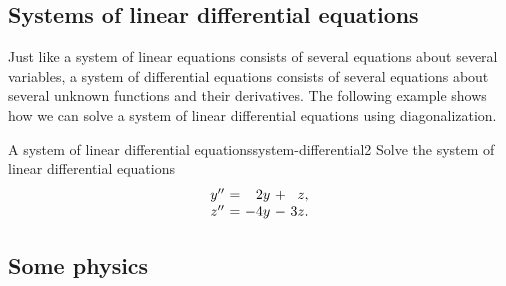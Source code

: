 \subsection{Systems of linear differential equations}

Just like a system of linear equations consists of several equations
about several variables, a system of differential equations consists
of several equations about several unknown functions and their
derivatives. The following example shows how we can solve a system of
linear differential equations using diagonalization.

\begin{example}{A system of linear differential equations}{system-differential2}
  Solve the system of linear differential equations
  \begin{equation*}
    \begin{array}{c@{~}c@{~}r@{~}r@{~}r}
      y'' &=& 2y &+& z, \\
      z'' &=& -4y &-& 3z. \\
    \end{array}
  \end{equation*}
  
\end{example}



\subsection{Some physics}

